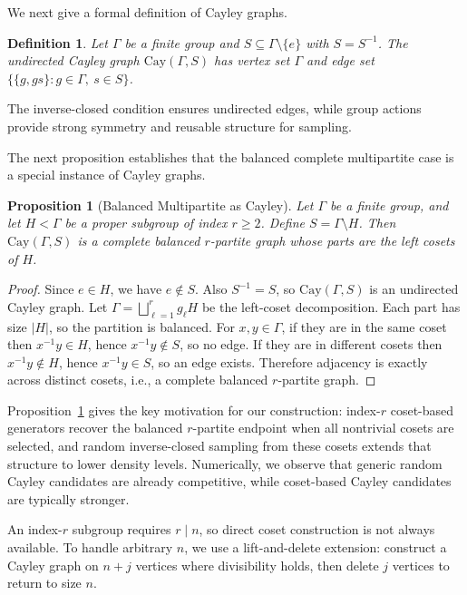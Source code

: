 \documentclass[letterpaper, 10 pt, conference]{ieeeconf}  %
\newtheorem{definition}{Definition}
\newtheorem{proposition}{Proposition}
\newcommand{\1}{\mathbf{1}}
\newcommand{\0}{\mathbf{0}}
\begin{document}
We next give a formal definition of Cayley graphs.
\begin{definition}
Let \(\Gamma\) be a finite group and \(S\subseteq \Gamma\setminus\{e\}\) with \(S=S^{-1}\).
The undirected Cayley graph \(\mathrm{Cay}(\Gamma,S)\) has vertex set \(\Gamma\) and edge set \(\{\{g,gs\}: g\in\Gamma,\ s\in S\}\).
\end{definition}
The inverse-closed condition ensures undirected edges, while group actions provide strong symmetry and reusable structure for sampling.

The next proposition establishes that the balanced complete multipartite case is a special instance of Cayley graphs.
\begin{proposition}[Balanced Multipartite as Cayley]
\label{prop:balanced_cmp_cayley}
Let \(\Gamma\) be a finite group, and let \(H<\Gamma\) be a proper subgroup of index \(r\ge 2\).
Define \(S=\Gamma\setminus H\).
Then \(\mathrm{Cay}(\Gamma,S)\) is a complete balanced \(r\)-partite graph whose parts are the left cosets of \(H\).
\end{proposition}
\begin{proof}
Since \(e\in H\), we have \(e\notin S\). Also \(S^{-1}=S\), so \(\mathrm{Cay}(\Gamma,S)\) is an undirected Cayley graph.
Let \(\Gamma=\bigsqcup_{\ell=1}^r g_\ell H\) be the left-coset decomposition. Each part has size \(|H|\), so the partition is balanced.
For \(x,y\in\Gamma\), if they are in the same coset then \(x^{-1}y\in H\), hence \(x^{-1}y\notin S\), so no edge.
If they are in different cosets then \(x^{-1}y\notin H\), hence \(x^{-1}y\in S\), so an edge exists.
Therefore adjacency is exactly across distinct cosets, i.e., a complete balanced \(r\)-partite graph.
\end{proof}
Proposition~\ref{prop:balanced_cmp_cayley} gives the key motivation for our construction: index-\(r\) coset-based generators recover the balanced \(r\)-partite endpoint when all nontrivial cosets are selected, and random inverse-closed sampling from these cosets extends that structure to lower density levels.
Numerically, we observe that generic random Cayley candidates are already competitive, while coset-based Cayley candidates are typically stronger.

An index-\(r\) subgroup requires \(r\mid n\), so direct coset construction is not always available.
To handle arbitrary \(n\), we use a lift-and-delete extension: construct a Cayley graph on \(n+j\) vertices where divisibility holds, then delete \(j\) vertices to return to size \(n\).
\end{document}

